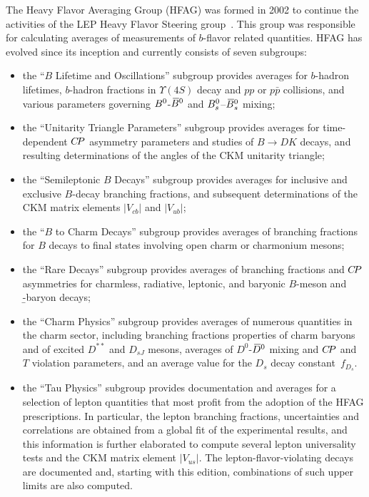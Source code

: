 The Heavy Flavor Averaging Group (HFAG) was formed in 2002 to 
continue the activities of the LEP Heavy Flavor Steering 
group~\cite{Abbaneo:2000ej_mod,*Abbaneo:2001bv_mod_cont}. 
This group was responsible for calculating averages of 
measurements of $b$-flavor related quantities. HFAG has evolved 
since its inception and currently consists of seven subgroups:
% 
\begin{itemize}
\item the ``$B$ Lifetime and Oscillations'' subgroup provides 
averages for $b$-hadron lifetimes, $b$-hadron fractions in 
$\Upsilon(4S)$ decay and $pp$ or $p\bar{p}$ collisions, and various 
parameters governing $B^0$-$\kern 0.18em\overline{\kern -0.18em B}{}^0$ and $B^0_s$--$\kern 0.18em\overline{\kern -0.18em B}{}_s^0$ mixing;

\item the ``Unitarity Triangle Parameters'' subgroup provides
averages for time-dependent $C\!P$ asymmetry parameters and studies of $B \to DK$ decays, and 
resulting determinations of the angles of the CKM unitarity triangle;

\item the ``Semileptonic $B$ Decays'' subgroup provides averages
for inclusive and exclusive $B$-decay branching fractions, and
subsequent determinations of the CKM matrix elements 
$|V_{cb}|$ and $|V_{ub}|$;

\item the ``$B$ to Charm Decays'' subgroup provides averages of 
branching fractions for $B$ decays to final states involving open 
charm or charmonium mesons;

\item the ``Rare Decays'' subgroup provides averages of branching 
fractions and $C\!P$ asymmetries for charmless, radiative, 
leptonic, and baryonic $B$-meson and \b-baryon decays;

\item the ``Charm Physics'' subgroup provides averages of numerous quantities in the charm sector, including branching fractions 
properties of charm baryons and of excited $D^{**}$ and $D^{}_{sJ}$ mesons, 
averages of $D^0$-$\kern 0.2em\overline{\kern -0.2em D}{}^0$ mixing and $C\!P$ and $T$ violation parameters, 
and an average value for the $D^{}_s$ decay constant~$f^{}_{D_s}$.

\item the ``Tau Physics'' subgroup provides documentation and
averages for a selection of \mtau lepton quantities that most profit
from the adoption of the HFAG prescriptions. In particular, the \mtau
lepton branching fractions, uncertainties and correlations are
obtained from a global fit of the experimental results, and this
information is further elaborated to compute several lepton
universality tests and the CKM matrix element $|V_{us}|$. The \mtau
lepton-flavor-violating decays are documented and, starting with this
edition, combinations of such upper limits are also computed.
\end{itemize}

